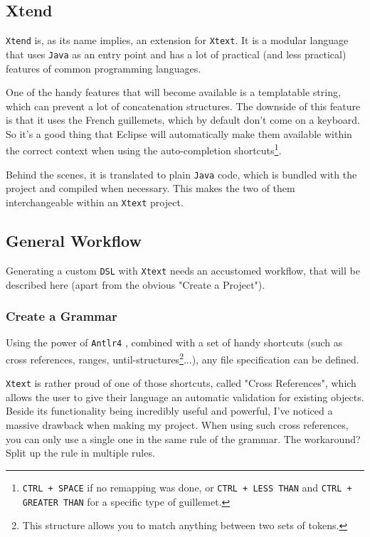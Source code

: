 \documentclass[review]{elsarticle}
\begin{document}
\subsection{Xtend}
\texttt{Xtend} is, as its name implies, an extension for \texttt{Xtext}. It is a modular language that uses \texttt{Java} as an entry point and has a lot of practical (and less practical) features of common programming languages.

One of the handy features that will become available is a templatable string, which can prevent a lot of concatenation structures. The downside of this feature is that it uses the \textsf{French guillemets}, which by default don't come on a keyboard. So it's a good thing that \textsf{Eclipse} will automatically make them available within the correct context when using the auto-completion shortcuts\footnote{\texttt{CTRL + SPACE} if no remapping was done, or \texttt{CTRL + LESS THAN} and \texttt{CTRL + GREATER THAN} for a specific type of guillemet.}.

Behind the scenes, it is translated to plain \texttt{Java} code, which is bundled with the project and compiled when necessary. This makes the two of them interchangeable within an \texttt{Xtext} project.

\subsection{General Workflow}
Generating a custom \texttt{DSL} with \texttt{Xtext} needs an accustomed workflow, that will be described here (apart from the obvious "\textsf{Create a Project}").

\subsubsection{Create a Grammar}
Using the power of \texttt{Antlr4} \cite{antlr}, combined with a set of handy shortcuts (such as cross references, ranges, until-structures\footnote{This structure allows you to match anything between two sets of tokens.}...), any file specification can be defined.

\texttt{Xtext} is rather proud of one of those shortcuts, called "\textsf{Cross References}", which allows the user to give their language an automatic validation for existing objects. Beside its functionality being incredibly useful and powerful, I've noticed a massive drawback when making my project. When using such cross references, you can only use a single one in the same rule of the grammar. The workaround? Split up the rule in multiple rules.
\end{document}
